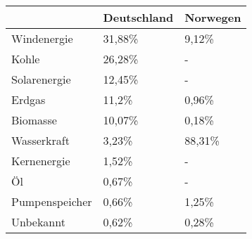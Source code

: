 \begin{tabular}{|p{5cm}|p{5cm}|p{5cm}|}
    \hline
    & Deutschland & Norwegen \\
    \hline
    \hline
    Windenergie & 31,88\% & 9,12\% \\
    \hline
    Kohle & 26,28\% & -\\
    \hline
    Solarenergie & 12,45\% & -\\
    \hline
    Erdgas & 11,2\% & 0,96\% \\
    \hline
    Biomasse & 10,07\% & 0,18\% \\
    \hline
    Wasserkraft & 3,23\% & 88,31\% \\
    \hline
    Kernenergie & 1,52\% & -\\
    \hline
    Öl & 0,67\% & -\\
    \hline
    Pumpenspeicher & 0,66\% & 1,25\% \\
    \hline
    Unbekannt & 0,62\% & 0,28\% \\
    \hline
\end{tabular}

